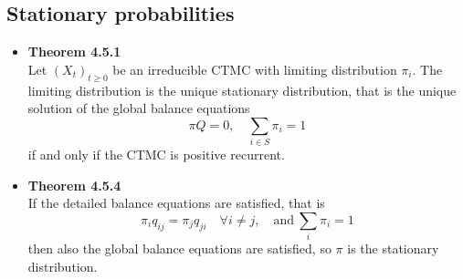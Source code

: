 \documentclass[11pt,a4paper]{article}
\begin{document}
\subsection{Stationary probabilities}

\begin{itemize}
    \item \textbf{Theorem 4.5.1} \\
        Let ${(X_t)}_{t \geq 0}$ be an irreducible CTMC with limiting distribution $\pi_i$.
        The limiting distribution is the unique stationary distribution,
        that is the unique solution of the global balance equations
        \[
            \pi Q = 0, \quad \sum_{i \in S} \pi_i = 1
        \]
        if and only if the CTMC is positive recurrent.
    \item \textbf{Theorem 4.5.4} \\
        If the detailed balance equations are satisfied, that is
        \[
            \pi_i q_{ij} = \pi_j q_{ji} \quad \forall i \neq j, \quad \text{and} \
            \sum_i \pi_i = 1
        \]
        then also the global balance equations are satisfied, so $\pi$ is the
        stationary distribution.
\end{itemize}
\end{document}
